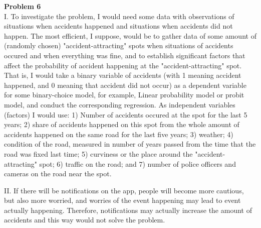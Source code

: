 \documentclass{article}
\begin{document}
\textbf{Problem 6}
\\

I. To investigate the problem, I would need some data with observations of situations when accidents happened and situations when accidents did not happen. The most efficient, I suppose, would be to gather data of some amount of (randomly chosen) "accident-attracting" spots when situations of accidents occured and when everything was fine, and to establish significant factors that affect the probability of accident happening at the "accident-attracting" spot. That is, I would take a binary variable of accidents (with 1 meaning accident happened, and 0 meaning that accident did not occur) as a dependent variable for some binary-choice model, for example, Linear probability model or probit model, and conduct the corresponding regression. As independent variables (factors) I would use: 1) Number of accidents occured at the spot for the last 5 years; 2) share of accidents happened on this spot from the whole amount of accidents happened on the same road for the last five years; 3) weather; 4) condition of the road, measured in number of years passed from the time that the road was fixed last time; 5) curviness or the place around the "accident-attracting" spot; 6) traffic on the road; and 7) number of police officers and cameras on the road near the spot. 

II. If there will be notifications on the app, people will become more cautious, but also more worried, and worries of the event happening may lead to event actually happening. Therefore, notifications may actually increase the amount of accidents and this way would not solve the problem.  
\end{document}
